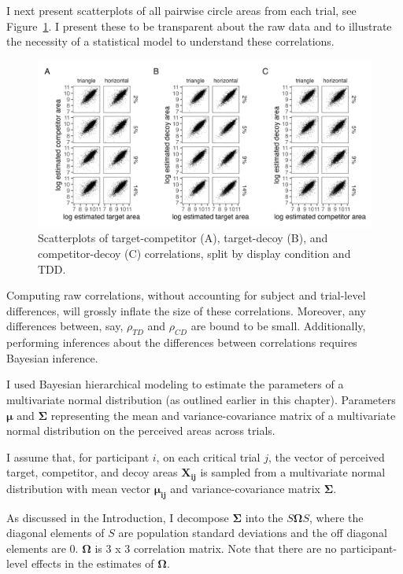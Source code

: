 I next present scatterplots of all pairwise circle areas from each trial, see Figure~\ref{fig:raw_cors}. I present these to be transparent about the raw data and to illustrate the necessity of a statistical model to understand these correlations. 

\begin{figure}
   \includegraphics[width=\textwidth]{figures/circleAreaPhase_cor_plot_all_no_outliers.jpg}
   \caption{Scatterplots of target-competitor (A), target-decoy (B), and competitor-decoy (C) correlations, split by display condition and TDD.}
   \label{fig:raw_cors}
\end{figure}

Computing raw correlations, without accounting for subject and trial-level differences, will grossly inflate the size of these correlations. Moreover, any differences between, say, $\rho_{TD}$ and $\rho_{CD}$ are bound to be small. Additionally, performing inferences about the differences between correlations requires Bayesian inference. 

I used Bayesian hierarchical modeling to estimate the parameters of a multivariate normal distribution (as outlined earlier in this chapter). Parameters $\boldsymbol{\mu}$ and $\boldsymbol{\Sigma}$ representing the mean and variance-covariance matrix of a multivariate normal distribution on the perceived areas across trials. 

I assume that, for participant $i$, on each critical trial $j$, the vector of perceived target, competitor, and decoy areas $\mathbf{X_{ij}}$ is sampled from a multivariate normal distribution with mean vector $\boldsymbol{\mu_{ij}}$ and variance-covariance matrix $\boldsymbol{\Sigma}$. 

As discussed in the Introduction, I decompose $\boldsymbol{\Sigma}$ into the $S\boldsymbol{\Omega}S$, where the diagonal elements of $S$ are population standard deviations and the off diagonal elements are $0$. $\boldsymbol{\Omega}$ is 3 x 3 correlation matrix. Note that there are no participant-level effects in the estimates of $\boldsymbol{\Omega}$.

